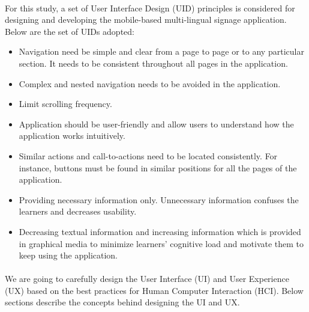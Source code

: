 \documentclass[12pt]{article}
\begin{document}
\paragraph{} For this study, a set of User Interface Design (UID) principles is considered \cite{uid} for designing and developing the mobile-based multi-lingual signage application. Below are the set of UIDs adopted:

\begin{itemize}

 \item  Navigation need be simple and clear from a page to page or to
any particular section. It needs to be
consistent throughout all pages in the application.

 \item  Complex and nested navigation needs to be avoided in the application.

 \item Limit scrolling frequency.

 \item Application should be user-friendly and allow
users to understand how the application works intuitively.

 \item Similar actions and call-to-actions need to be located consistently. For instance,  buttons must be
found in similar positions for all the pages of the
application.

 \item Providing necessary information only. Unnecessary
information confuses the learners and decreases usability.

 \item  Decreasing textual information and increasing
information which is provided in graphical media to minimize learners' cognitive load and motivate
them to keep using the application.

\end{itemize}




\paragraph{}We are going to carefully design the User Interface (UI) and User Experience (UX) based on the best practices for Human Computer Interaction (HCI). Below sections describe the concepts behind designing the UI and UX.
\end{document}
